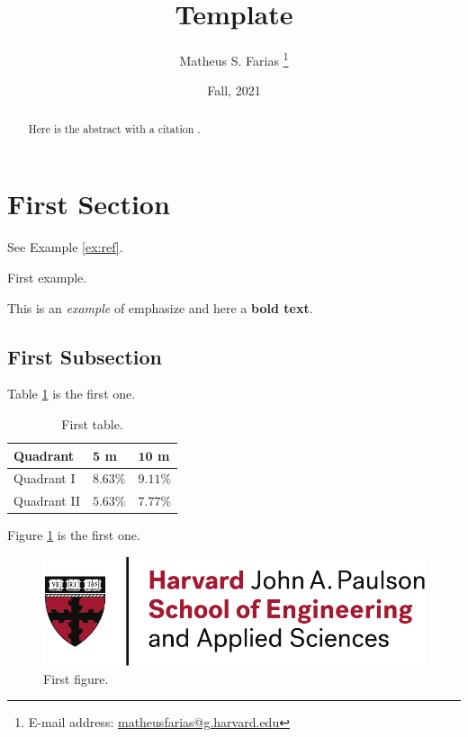 \documentclass[abstract=true]{scrartcl}
\begin{document}
\title{Template}
\date{Fall, 2021}

\author{Matheus S. Farias%
  \thanks{E-mail address: \href{mailto:matheusfarias@g.harvard.edu}{matheusfarias@g.harvard.edu}}}

\maketitle

\begin{abstract}
    Here is the abstract with a citation \cite{moore65}.
\end{abstract}

\tableofcontents

\section{First Section}
See Example \ref{ex:ref}.
\begin{example}
    First example.
    \label{ex:ref}
\end{example}

This is an \emph{example} of emphasize and here a \textbf{bold text}.

\subsection{First Subsection}

Table \ref{tab:ref} is the first one.
\begin{table}[h]
    \centering
    \caption{\label{tab:ref}First table.}
    \vspace{5pt}
    \begin{tabular}{@{}lll@{}}
    \toprule
    \textbf{Quadrant}    & $\mathbf{5}$ \textbf{m}    & $\mathbf{10}$ \textbf{m}    \\
    \midrule
    Quadrant I  & $8.63\%$ & $9.11\%$ \\
    Quadrant II & $5.63\%$ & $7.77\%$   \\ 
    \bottomrule
\end{tabular}
\end{table}

Figure \ref{fig:ref} is the first one.
\begin{figure}
    \centering
    \includegraphics[width = \textwidth]{figures/logo.pdf}
    \caption{First figure.}
    \label{fig:ref}
\end{figure}


\end{document}
